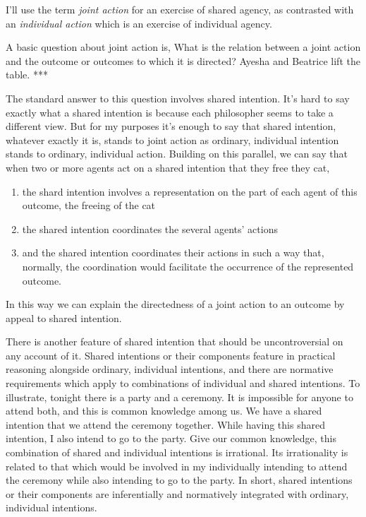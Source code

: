 \documentclass[12pt,\papersize]{extarticle}
\begin{document}
I'll use the term \emph{joint action} for an exercise of shared agency, as contrasted with an \emph{individual action} which is an exercise of individual agency.



A basic question about joint action is,
What is the relation between a joint action and the outcome or outcomes to which it is directed?
Ayesha and Beatrice lift the table. ***

The standard answer to this question involves shared intention.
It's hard to say exactly what a shared intention is because each philosopher seems to take a different view.
But for my purposes it's enough to say that shared intention, whatever exactly it is, stands to joint action as ordinary, individual intention stands to ordinary, individual action.
Building on this parallel,
we can say that when two or more agents act on a shared intention that they free they cat,
\begin{enumerate}
\item the shard intention involves a representation on the part of each agent of this outcome, the freeing of the cat
\item the shared intention coordinates the several agents' actions
\item and the shared intention coordinates their actions in such a way that, normally, the coordination would facilitate the occurrence of the represented outcome. 
\end{enumerate}
In this way we can explain the directedness of a joint action to an outcome by appeal to shared intention.

There is another feature of shared intention that should be uncontroversial on any account of it.  
Shared intentions or their components feature in practical reasoning alongside ordinary, individual intentions,
 and there are normative requirements which apply to combinations of individual and shared intentions.
To illustrate, tonight there is a party and a ceremony.
It is impossible for anyone to attend both, and this is common knowledge among us.
We have a shared intention that we attend the ceremony together.
While having this shared intention, I also intend to go to the party. 
Give our common knowledge,
this combination of shared and individual intentions is irrational. 
Its irrationality is related to that which would be involved in my individually intending to attend the ceremony while also intending to go to the party.
In short, shared intentions or their components are inferentially and normatively integrated with ordinary, individual intentions.
\end{document}
